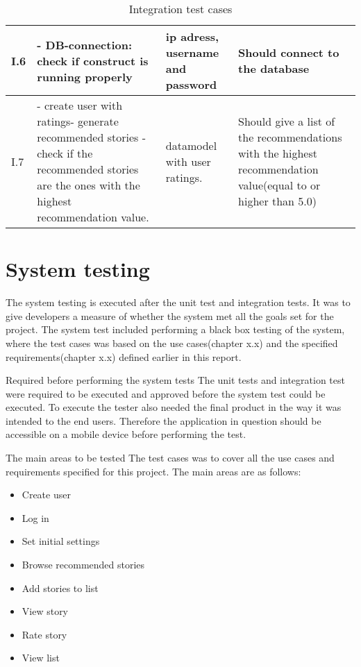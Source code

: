 \begin{table}[!h]
\begin{tabular}{ | p{1cm} | p{6.5cm} | p{3cm} | p{6.5cm} |}
			I.6 & - DB-connection: check if construct is running properly & ip adress, username and password & Should connect to the database \\ \hline
			
			I.7 & - create user with ratings\newline - generate recommended stories \newline - check if the recommended stories are the ones with the highest recommendation value. & datamodel with user ratings. & Should give a list of the recommendations with the highest recommendation value(equal to or higher than 5.0)  \\ \hline
		\end{tabular}
	\caption{Integration test cases}
	\label{Tab_integrationtestcases}
\end{table}

\section{System testing}

The system testing is executed after the unit test and integration tests. It was to give developers a measure of whether the system met all the goals set for the project.  The system test included performing a black box testing of the system, where the test cases was based on the use cases(chapter x.x) and the specified requirements(chapter x.x)  defined earlier in this report. \newline

Required before performing the system tests\newline
The unit tests and integration test were required to be executed and approved before the system test could be executed. To execute the tester also needed the final product in the way it was intended to the end users. Therefore the application in question should be accessible on a mobile device before performing the test. \newline

The main areas to be tested\newline
The test cases was to cover all the use cases and requirements specified for this project. The main areas are as follows:
\begin{itemize}
	\item Create user
	\item Log in
	\item Set initial settings
	\item Browse recommended stories
	\item Add stories to list
	\item View story
	\item Rate story 
	\item View list \newline
\end{itemize}

